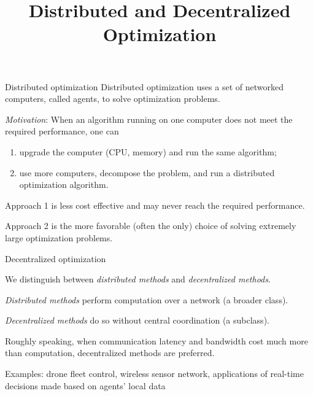 \documentclass[10pt,mathserif]{beamer}
\title{\large \bfseries Distributed and Decentralized Optimization}
\begin{document}
\frame{
\thispagestyle{empty}
\titlepage
}

\begin{frame}{Distributed optimization}
    Distributed optimization uses a set of networked computers, called agents, to solve optimization problems.
    \bigskip
    
    \emph{Motivation}: When an algorithm running on one computer does not meet the required performance, one can
    \begin{enumerate}
        \item upgrade the computer (CPU, memory) and run the same algorithm;
        \item use more computers, decompose the problem, and run a distributed optimization algorithm.
    \end{enumerate}
    \pause\smallskip
    
    Approach 1 is less cost effective and may never reach the required performance. 
    \medskip
    
    Approach 2 is the more favorable (often the only) choice of solving extremely large optimization problems.
\end{frame}

\begin{frame}{Decentralized optimization}

    We distinguish between \emph{distributed methods} and \emph{decentralized methods}.
    \pause\medskip
    
    \emph{Distributed methods} perform computation over a network (a broader class). 
    \medskip
    
    \emph{Decentralized methods} do so without central coordination (a subclass).
    \pause\medskip
    
    Roughly speaking, when communication latency and bandwidth cost much more than computation, decentralized methods are preferred.
    \medskip
    
    Examples: drone fleet control, wireless sensor network, applications of real-time decisions made based on agents' local data
\end{frame}
\end{document}
